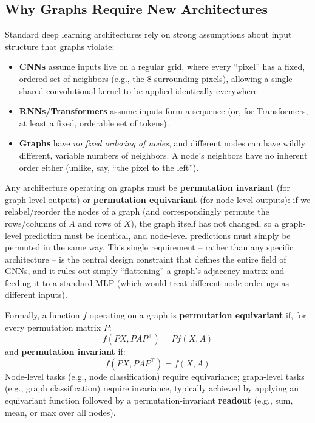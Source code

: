 \documentclass[12pt,a4paper]{article}
\begin{document}
\subsection{Why Graphs Require New Architectures}

Standard deep learning architectures rely on strong assumptions about input structure that graphs violate:

\begin{itemize}[leftmargin=1.5em]
    \item \textbf{CNNs} assume inputs live on a regular grid, where every ``pixel'' has a fixed, ordered set of neighbors (e.g., the 8 surrounding pixels), allowing a single shared convolutional kernel to be applied identically everywhere.
    \item \textbf{RNNs/Transformers} assume inputs form a sequence (or, for Transformers, at least a fixed, orderable set of tokens).
    \item \textbf{Graphs} have \emph{no fixed ordering of nodes}, and different nodes can have wildly different, variable numbers of neighbors. A node's neighbors have no inherent order either (unlike, say, ``the pixel to the left'').
\end{itemize}

\begin{keyidea}
Any architecture operating on graphs must be \textbf{permutation invariant} (for graph-level outputs) or \textbf{permutation equivariant} (for node-level outputs): if we relabel/reorder the nodes of a graph (and correspondingly permute the rows/columns of $A$ and rows of $X$), the graph itself has not changed, so a graph-level prediction must be identical, and node-level predictions must simply be permuted in the same way. This single requirement -- rather than any specific architecture -- is the central design constraint that defines the entire field of GNNs, and it rules out simply ``flattening'' a graph's adjacency matrix and feeding it to a standard MLP (which would treat different node orderings as different inputs).
\end{keyidea}

\begin{defbox}
Formally, a function $f$ operating on a graph is \textbf{permutation equivariant} if, for every permutation matrix $P$:
\[
f(PX, PAP^\top) = P f(X, A)
\]
and \textbf{permutation invariant} if:
\[
f(PX, PAP^\top) = f(X, A)
\]
Node-level tasks (e.g., node classification) require equivariance; graph-level tasks (e.g., graph classification) require invariance, typically achieved by applying an equivariant function followed by a permutation-invariant \textbf{readout} (e.g., sum, mean, or max over all nodes).
\end{defbox}
\end{document}
